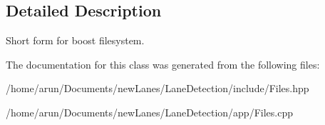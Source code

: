 \subsection{Detailed Description}
Short form for boost filesystem. 

The documentation for this class was generated from the following files\+:\begin{DoxyCompactItemize}
\item 
/home/arun/\+Documents/new\+Lanes/\+Lane\+Detection/include/Files.\+hpp\item 
/home/arun/\+Documents/new\+Lanes/\+Lane\+Detection/app/Files.\+cpp\end{DoxyCompactItemize}
